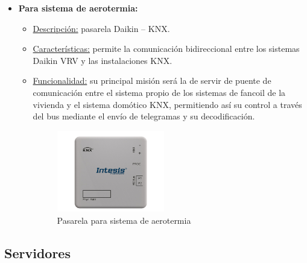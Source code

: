 \begin{itemize}
\item \textbf{Para sistema de aerotermia:} 
	\begin{itemize}
	\item\underline{Descripción:} pasarela Daikin – KNX.
	\item \underline{Características:} permite la comunicación bidireccional entre los sistemas Daikin VRV y las instalaciones KNX. 
	\item \underline{Funcionalidad:} su principal misión será la de servir de puente de comunicación entre el sistema propio de los sistemas de fancoil de la vivienda y el sistema domótico KNX, permitiendo así su control a través del bus mediante el envío de telegramas y su decodificación.
	\begin{figure}[h]
	\centering
	\includegraphics[width=0.47\textwidth]{figures/pasarela.png}   
	\caption{Pasarela para sistema de aerotermia}
	\label{fig:pasarela}
	\end{figure}
	\end{itemize} 
\end{itemize} 

\subsection{Servidores}

